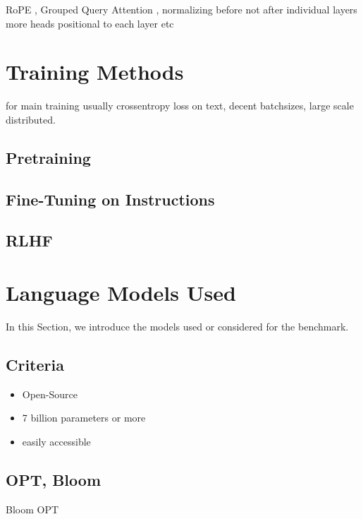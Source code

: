 
RoPE \cite{su_roformer_2022},
Grouped Query Attention \cite{ainslie_gqa_2023},
normalizing before not after individual layers
more heads
positional to each layer
etc

\section{Training Methods}\label{sec:training}
for main training usually crossentropy loss on text, decent batchsizes, large scale distributed.
\subsection{Pretraining}

\subsection{Fine-Tuning on Instructions}

\subsection{RLHF}

\section{Language Models Used}\label{sec:models}
In this Section, we introduce the models used or considered for the benchmark.

\subsection{Criteria}\label{sub:criteria}
\begin{itemize}
    \item Open-Source
    \item 7 billion parameters or more
    \item easily accessible
\end{itemize}

\subsection{OPT, Bloom}\label{sub:opt}
Bloom \cite{workshop_bloom_2022}
OPT \cite{zhang_opt_2022}

